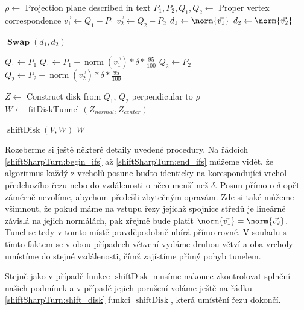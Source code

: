 \begin{algorithmic}[1]
\label{alg:shiftSharpTurn}

    \State $ \rho \gets $ Projection plane described in text
    \State $ P_1, P_2, Q_1, Q_2 \gets $ Proper vertex correspondence
    \State $ \vec{v_1} \gets Q_1 - P_1 $
    \State $ \vec{v_2} \gets Q_2 - P_2 $
    \State $ d_1 \gets \norm{\vec{v_1}} $
    \State $ d_2 \gets \norm{\vec{v_2}} $

    \Statex
        \State $ \operatorname{\mathbf{Swap}}(d_1, d_2) $
    \EndIf

    \Statex
     \label{shiftSharpTurn:begin_ifs}
        \State $ Q_1 \gets P_1$
    \Else
        \State $ Q_1 \gets P_1 + \operatorname{norm}(\vec{v_1}) * \delta * \frac{95}{100} $
    \EndIf
        \State $ Q_2 \gets P_2$
    \Else
        \State $ Q_2 \gets P_2 + \operatorname{norm}(\vec{v_2}) * \delta * \frac{95}{100} $ \label{shiftSharpTurn:end_ifs}
    \EndIf

    \Statex
    \State $ Z \gets $ Construct disk from $ Q_1$, $Q_2$ perpendicular to $ \rho $
    \State $ W \gets \operatorname{fitDiskTunnel}(Z_{normal}, Z_{center}) $
    \Statex

        \State \Return $ \operatorname{shiftDisk}(V, W) $ \label{shiftSharpTurn:shift_disk}
    \Else
        \State \Return $ W $
    \EndIf

\EndFunction

\end{algorithmic}

Rozeberme si ještě některé detaily uvedené procedury. Na řádcích
\ref{shiftSharpTurn:begin_ifs} až \ref{shiftSharpTurn:end_ifs} můžeme vidět, že
algoritmus každý z vrcholů posune buďto identicky na korespondující vrchol
předchozího řezu nebo do vzdálenosti o něco menší než $ \delta $. Posun přímo
o $ \delta $ opět záměrně nevolíme, abychom předešli zbytečným opravám. Zde si
také můžeme všimnout, že pokud máme na vstupu řezy jejichž spojnice středů
je lineárně závislá na jejich normálách, pak zřejmě bude platit
$ \norm{\vec{v_1}} = \norm{\vec{v_2}} $. Tunel se tedy v tomto místě
pravděpodobně ubírá přímo rovně. V souladu s tímto faktem se v obou případech
větvení vydáme druhou větví a oba vrcholy umístíme do stejné vzdálenosti, čímž
zajístíme přímý pohyb tunelem.

Stejně jako v případě funkce $ \operatorname{shiftDisk} $ musíme nakonec
zkontrolovat splnění našich podmínek a v případě jejich porušení voláme ještě
na řádku \ref{shiftSharpTurn:shift_disk} funkci $ \operatorname{shiftDisk} $,
která umístění řezu dokončí.





